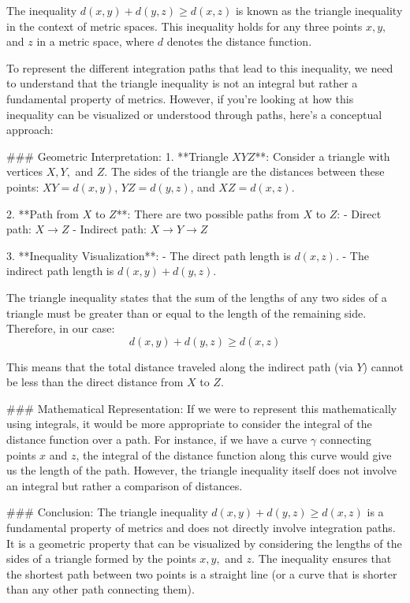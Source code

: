 The inequality \( d(x, y) + d(y, z) \geq d(x, z) \) is known as the triangle inequality in the context of metric spaces. This inequality holds for any three points \( x, y, \) and \( z \) in a metric space, where \( d \) denotes the distance function.

To represent the different integration paths that lead to this inequality, we need to understand that the triangle inequality is not an integral but rather a fundamental property of metrics. However, if you're looking at how this inequality can be visualized or understood through paths, here's a conceptual approach:

### Geometric Interpretation:
1. **Triangle \( XYZ \)**: Consider a triangle with vertices \( X, Y, \) and \( Z \). The sides of the triangle are the distances between these points: \( XY = d(x, y) \), \( YZ = d(y, z) \), and \( XZ = d(x, z) \).

2. **Path from \( X \) to \( Z \)**: There are two possible paths from \( X \) to \( Z \):
   - Direct path: \( X \to Z \)
   - Indirect path: \( X \to Y \to Z \)

3. **Inequality Visualization**:
   - The direct path length is \( d(x, z) \).
   - The indirect path length is \( d(x, y) + d(y, z) \).

The triangle inequality states that the sum of the lengths of any two sides of a triangle must be greater than or equal to the length of the remaining side. Therefore, in our case:
\[ d(x, y) + d(y, z) \geq d(x, z) \]

This means that the total distance traveled along the indirect path (via \( Y \)) cannot be less than the direct distance from \( X \) to \( Z \).

### Mathematical Representation:
If we were to represent this mathematically using integrals, it would be more appropriate to consider the integral of the distance function over a path. For instance, if we have a curve \( \gamma \) connecting points \( x \) and \( z \), the integral of the distance function along this curve would give us the length of the path. However, the triangle inequality itself does not involve an integral but rather a comparison of distances.

### Conclusion:
The triangle inequality \( d(x, y) + d(y, z) \geq d(x, z) \) is a fundamental property of metrics and does not directly involve integration paths. It is a geometric property that can be visualized by considering the lengths of the sides of a triangle formed by the points \( x, y, \) and \( z \). The inequality ensures that the shortest path between two points is a straight line (or a curve that is shorter than any other path connecting them).